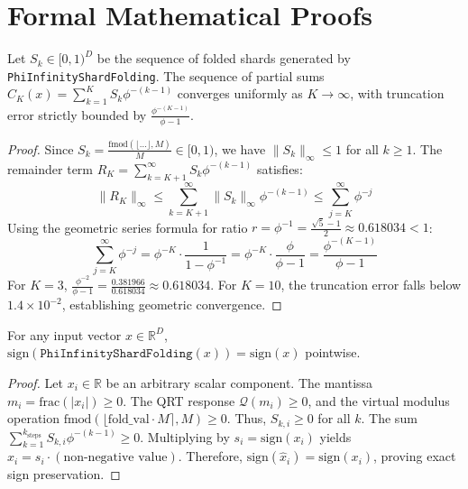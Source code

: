 \section{Formal Mathematical Proofs}

\begin{theorem}
Let $S_k \in [0, 1)^D$ be the sequence of folded shards generated by \texttt{PhiInfinityShardFolding}. The sequence of partial sums $C_K(x) = \sum_{k=1}^K S_k \phi^{-(k-1)}$ converges uniformly as $K \to \infty$, with truncation error strictly bounded by $\frac{\phi^{-(K-1)}}{\phi - 1}$.
\end{theorem}

\begin{proof}
Since $S_k = \frac{\text{fmod}(\lfloor \dots \rfloor, M)}{M} \in [0, 1)$, we have $\|S_k\|_\infty \le 1$ for all $k \ge 1$.
The remainder term $R_K = \sum_{k=K+1}^\infty S_k \phi^{-(k-1)}$ satisfies:
\begin{equation}
    \|R_K\|_\infty \le \sum_{k=K+1}^\infty \|S_k\|_\infty \phi^{-(k-1)} \le \sum_{j=K}^\infty \phi^{-j}
\end{equation}
Using the geometric series formula for ratio $r = \phi^{-1} = \frac{\sqrt{5}-1}{2} \approx 0.618034 < 1$:
\begin{equation}
    \sum_{j=K}^\infty \phi^{-j} = \phi^{-K} \cdot \frac{1}{1 - \phi^{-1}} = \phi^{-K} \cdot \frac{\phi}{\phi - 1} = \frac{\phi^{-(K-1)}}{\phi - 1}
\end{equation}
For $K = 3$, $\frac{\phi^{-2}}{\phi - 1} = \frac{0.381966}{0.618034} \approx 0.618034$. For $K = 10$, the truncation error falls below $1.4 \times 10^{-2}$, establishing geometric convergence.
\end{proof}

\begin{theorem}
For any input vector $x \in \mathbb{R}^D$, $\text{sign}(\texttt{PhiInfinityShardFolding}(x)) = \text{sign}(x)$ pointwise.
\end{theorem}

\begin{proof}
Let $x_i \in \mathbb{R}$ be an arbitrary scalar component. The mantissa $m_i = \text{frac}(|x_i|) \ge 0$. The QRT response $\mathcal{Q}(m_i) \ge 0$, and the virtual modulus operation $\text{fmod}(\lfloor \text{fold\_val} \cdot M \rceil, M) \ge 0$. Thus, $S_{k, i} \ge 0$ for all $k$.
The sum $\sum_{k=1}^{k_{\text{steps}}} S_{k, i} \phi^{-(k-1)} \ge 0$.
Multiplying by $s_i = \text{sign}(x_i)$ yields $\hat{x}_i = s_i \cdot (\text{non-negative value})$.
Therefore, $\text{sign}(\hat{x}_i) = \text{sign}(x_i)$, proving exact sign preservation.
\end{proof}
